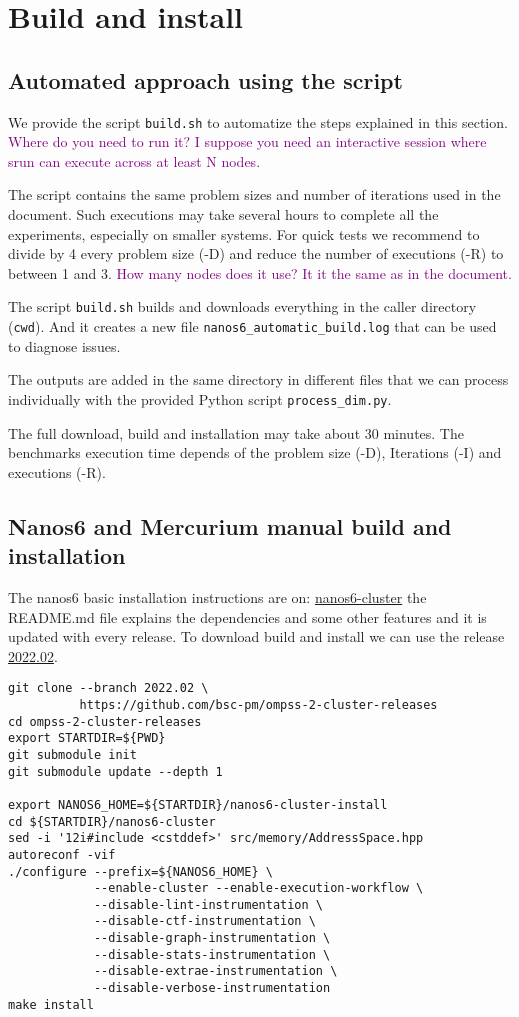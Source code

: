 \documentclass{article}
\newcommand{\paul}[1]{\textcolor{purple}{#1}}
\newcommand{\code}[1]{\texttt{#1}}
\begin{document}
\section{Build and install}

\subsection{Automated approach using the script}

We provide the script \code{build.sh} to automatize the steps
explained in this section. \paul{Where do you need to run it? 
I suppose you need an interactive session where srun can execute
across at least N nodes.}

The script contains the same problem sizes and number of
iterations used in the document. Such executions may take several
hours to complete all the experiments, especially on smaller
systems. For quick tests we recommend to divide by 4 every problem
size (-D) and reduce the number of executions (-R) to between 1 and 3.
\paul{How many nodes does it use? It it the same as in the document.}

The script \code{build.sh} builds and downloads everything in the
caller directory (\code{cwd}). And it creates a new file
\code{nanos6\_automatic\_build.log} that can be used to diagnose
issues.

The outputs are added in the same directory in different files that we
can process individually with the provided Python script
\code{process\_dim.py}.

The full download, build and installation may take about 30
minutes. The benchmarks execution time depends of the problem size
(-D), Iterations (-I) and executions (-R).

\subsection{Nanos6 and Mercurium manual build and installation}

The nanos6 basic installation instructions are on:
\href{https://github.com/bsc-pm/nanos6-cluster}{nanos6-cluster} the
README.md file explains the dependencies and some other features and it
is updated with every release. To download build and install we can
use the release
\href{https://github.com/bsc-pm/ompss-2-cluster-releases}{2022.02}.

\newpage
\begin{lstlisting}
git clone --branch 2022.02 \
          https://github.com/bsc-pm/ompss-2-cluster-releases
cd ompss-2-cluster-releases
export STARTDIR=${PWD}
git submodule init
git submodule update --depth 1

export NANOS6_HOME=${STARTDIR}/nanos6-cluster-install
cd ${STARTDIR}/nanos6-cluster
sed -i '12i#include <cstddef>' src/memory/AddressSpace.hpp
autoreconf -vif
./configure --prefix=${NANOS6_HOME} \
            --enable-cluster --enable-execution-workflow \
            --disable-lint-instrumentation \
            --disable-ctf-instrumentation \
            --disable-graph-instrumentation \
            --disable-stats-instrumentation \
            --disable-extrae-instrumentation \
            --disable-verbose-instrumentation
make install
\end{lstlisting}
\end{document}
